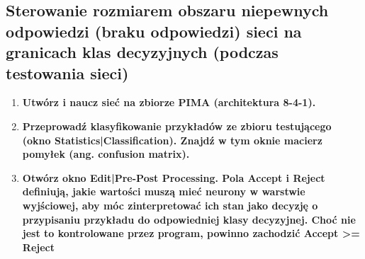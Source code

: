 \subsection{Sterowanie rozmiarem obszaru niepewnych odpowiedzi (braku odpowiedzi) sieci na granicach klas decyzyjnych (podczas testowania sieci)}
\begin{enumerate}
\item \textbf{Utwórz i naucz sieć na zbiorze PIMA (architektura 8-4-1).}

\item \textbf{
Przeprowadź klasyfikowanie przykładów ze zbioru testującego (okno Statistics|Classification). Znajdź w tym oknie macierz pomyłek (ang. confusion matrix).}

\item \textbf{
Otwórz okno Edit|Pre-Post Processing. Pola Accept i Reject definiują, jakie wartości muszą mieć neurony w warstwie wyjściowej, aby móc zinterpretować ich stan jako decyzję o przypisaniu przykładu do odpowiedniej klasy decyzyjnej. Choć nie jest to kontrolowane przez program, powinno zachodzić Accept >= Reject}


\end{enumerate}
